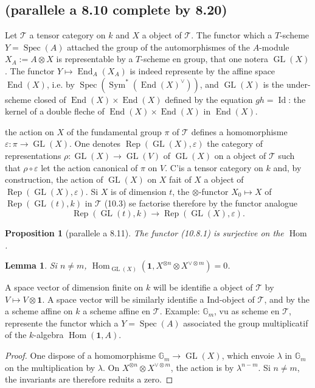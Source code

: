 \documentclass[11pt,a4paper]{article}
\theoremstyle{plain}
\newtheorem{lemma}[theorem]{Lemma}
\newtheorem{proposition}[theorem]{Proposition}
\theoremstyle{definition}
\DeclareMathOperator{\Hom}{Hom}
\DeclareMathOperator{\Spec}{Spec}
\DeclareMathOperator{\End}{End}
\DeclareMathOperator{\Sym}{Sym}
\DeclareMathOperator{\Rep}{Rep}
\DeclareMathOperator{\GL}{GL}
\newcommand{\eps}{\varepsilon}
\DeclareMathOperator{\Id}{Id}
\begin{document}
\subsection{(parallele a 8.10 complete by 8.20)}
Let $\mathcal{T}$ a tensor category on $k$ and $X$ a object of $\mathcal{T}$. The functor which a $T$-scheme $Y = \Spec(A)$ attached the group of the automorphismes of the $A$-module $X_A := A \otimes X$ is representable by a $T$-scheme en group, that one notera $\GL(X)$. The functor $Y \mapsto \End_A(X_A)$ is indeed represente by the affine space $\End(X)$, i.e. by $\Spec(\Sym^*(\End(X)^\vee))$, and $\GL(X)$ is the under-scheme closed of $\End(X) \times \End(X)$ defined by the equation $gh = \Id$: the kernel of a double fleche of $\End(X) \times \End(X)$ in $\End(X)$.

the action on $X$ of the fundamental group $\pi$ of $\mathcal{T}$ defines a homomorphisme $\eps : \pi \to \GL(X)$. One denotes $\Rep(\GL(X), \eps)$ the category of representations $\rho : \GL(X) \to \GL(V)$ of $\GL(X)$ on a object of $\mathcal{T}$ such that $\rho \circ \eps$ let the action canonical of $\pi$ on $V$. C'is a tensor category on $k$ and, by construction, the action of $\GL(X)$ on $X$ fait of $X$ a object of $\Rep(\GL(X), \eps)$. Si $X$ is of dimension $t$, the $\otimes$-functor $X_0 \mapsto X$ of $\Rep(\GL(t), k)$ in $\mathcal{T}$ (10.3) se factorise therefore by the functor analogue
\begin{equation}
\Rep(\GL(t), k) \to \Rep(\GL(X), \eps). \tag{10.8.1}
\end{equation}

\begin{proposition}[parallele a 8.11]
The functor (10.8.1) is surjective on the $\Hom$.
\end{proposition}

\begin{lemma}
Si $n \neq m$, $\Hom_{\GL(X)}(\mathbf{1}, X^{\otimes n} \otimes X^{\vee \otimes m}) = 0$.
\end{lemma}

A space vector of dimension finite on $k$ will be identifie a object of $\mathcal{T}$ by $V \mapsto V \otimes \mathbf{1}$. A space vector will be similarly identifie a Ind-object of $\mathcal{T}$, and by the a scheme affine on $k$ a scheme affine en $\mathcal{T}$. Example: $\mathbb{G}_m$, vu as scheme en $\mathcal{T}$, represente the functor which a $Y = \Spec(A)$ associated the group multiplicatif of the $k$-algebra $\Hom(\mathbf{1}, A)$.

\begin{proof}
One dispose of a homomorphisme $\mathbb{G}_m \to \GL(X)$, which envoie $\lambda$ in $\mathbb{G}_m$ on the multiplication by $\lambda$. On $X^{\otimes n} \otimes X^{\vee \otimes m}$, the action is by $\lambda^{n-m}$. Si $n \neq m$, the invariants are therefore reduits a zero.
\end{proof}
\end{document}
